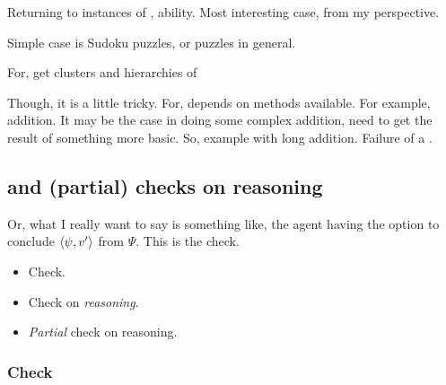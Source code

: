 \begin{note}
  Returning to instances of , ability.
  Most interesting case, from my perspective.

  Simple case is Sudoku puzzles, or puzzles in general.

  For, get clusters and hierarchies of 

  Though, it is a little tricky.
  For, depends on methods available.
  For example, addition.
  It may be the case in doing some complex addition, need to get the result of something more basic.
  So, example with long addition.
  Failure of a \requ{}.
\end{note}

\subsection{ and (partial) checks on reasoning}
\label{cha:zS:sec:requs:checks}

\begin{note}
  Or, what I really want to say is something like, the agent having the option to conclude \(\langle \psi, v' \rangle\) from \(\Psi\).
  This is the check.
\end{note}

\begin{note}
  \begin{itemize}
  \item Check.
  \item Check on \emph{reasoning}.
  \item \emph{Partial} check on reasoning.
  \end{itemize}
\end{note}

\subsubsection{Check}

